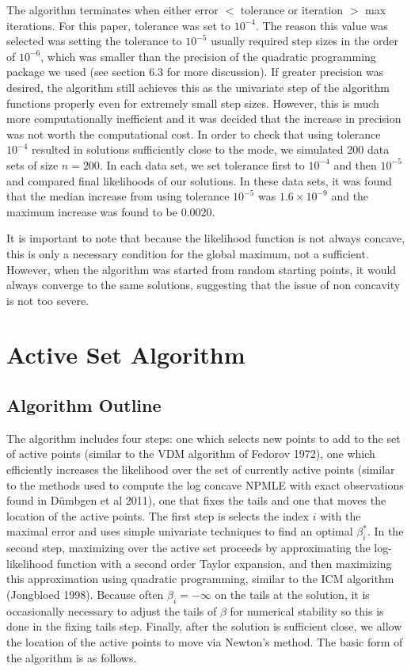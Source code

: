 \documentclass[12pt]{article}
\numberwithin{equation}{section}
\begin{document}
	The algorithm terminates when either error $<$ tolerance or iteration $>$ max iterations. For this paper, tolerance was set to $10^{-4}$. The reason this value was selected was setting the tolerance to $10^{-5}$ usually required step sizes in the order of $10^{-6}$, which was smaller than the precision of the quadratic programming package we used (see section 6.3 for more discussion). If greater precision was desired, the algorithm still achieves this as the univariate step of the algorithm functions properly even for extremely small step sizes. However, this is much more computationally inefficient and it was decided that the increase in precision was not worth the computational cost. In order to check that using tolerance $10^{-4}$ resulted in solutions sufficiently close to the mode, we simulated 200 data sets of size $n = 200$. In each data set, we set tolerance first to $10^{-4}$ and then $10^{-5}$ and compared final likelihoods of our solutions. In these data sets, it was found that the median increase from using tolerance $10^{-5}$ was $1.6 \times 10^{-9}$ and the maximum increase was found to be 0.0020. 
	
	It is important to note that because the likelihood function is not always concave, this is only a necessary condition for the global maximum, not a sufficient. However, when the algorithm was started from random starting points, it would always converge to the same solutions, suggesting that the issue of non concavity is not too severe. 
	
{\section{Active Set Algorithm} }
	
	{\subsection{Algorithm Outline} } 
	
	
	The algorithm includes four steps: one which selects new points to add to the set of active points (similar to the VDM algorithm of Fedorov 1972), one which efficiently increases the likelihood over the set of currently active points (similar to the methods used to compute the log concave NPMLE with exact observations found in D\"umbgen et al 2011), one that fixes the tails and one that moves the location of the active points. The first step is selects the index $i$ with the maximal error and uses simple univariate techniques to find an optimal $\beta_i^*$. In the second step, maximizing over the active set proceeds by approximating the log-likelihood function with a second order Taylor expansion, and then maximizing this approximation using quadratic programming, similar to the ICM algorithm (Jongbloed 1998).  Because often $\beta_i = -\infty$ on the tails at the solution, it is occasionally necessary to adjust the tails of $\beta$ for numerical stability so this is done in the fixing tails step. Finally, after the solution is sufficient close, we allow the location of the active points to move via Newton's method. The basic form of the algorithm is as follows.
	
\end{document}
